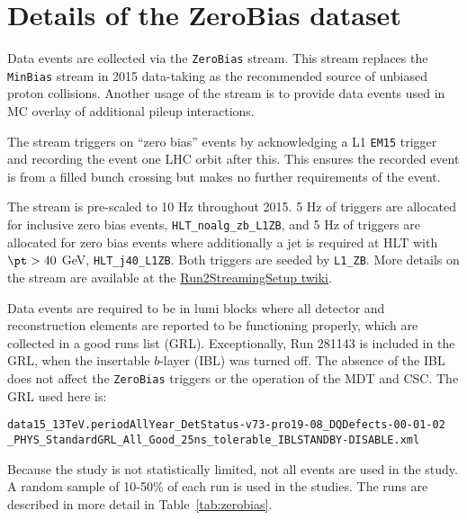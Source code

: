 \section{Details of the ZeroBias dataset}
\label{sec:zerobias}

Data events are collected via the \texttt{ZeroBias} stream. This stream replaces the \texttt{MinBias} stream in 2015 data-taking as the recommended source of unbiased proton collisions. Another usage of the stream is to provide data events used in MC overlay of additional pileup interactions. 

The stream triggers on ``zero bias'' events by acknowledging a L1 \texttt{EM15} trigger and recording the event one LHC orbit after this. This ensures the recorded event is from a filled bunch crossing but makes no further requirements of the event.

The stream is pre-scaled to 10 Hz throughout 2015. 5 Hz of triggers are allocated for inclusive zero bias events, \texttt{HLT\_noalg\_zb\_L1ZB}, and 5 Hz of triggers are allocated for zero bias events where additionally a jet is required at HLT with $\pt > 40$ GeV, \texttt{HLT\_j40\_L1ZB}. Both triggers are seeded by \texttt{L1\_ZB}. More details on the stream are available at the \href{https://twiki.cern.ch/twiki/bin/viewauth/Atlas/Run2StreamingSetup}{Run2StreamingSetup twiki}.

Data events are required to be in lumi blocks where all detector and reconstruction elements are reported to be functioning properly, which are collected in a good runs list (GRL). Exceptionally, Run 281143 is included in the GRL, when the insertable $b$-layer (IBL) was turned off. The absence of the IBL does not affect the \texttt{ZeroBias} triggers or the operation of the MDT and CSC. The GRL used here is:

\texttt{data15\_13TeV.periodAllYear\_DetStatus-v73-pro19-08\_DQDefects-00-01-02} \\
\texttt{\_PHYS\_StandardGRL\_All\_Good\_25ns\_tolerable\_IBLSTANDBY-DISABLE.xml}

Because the study is not statistically limited, not all events are used in the study. A random sample of 10-50\% of each run is used in the studies. The runs are described in more detail in Table~\ref{tab:zerobias}.

